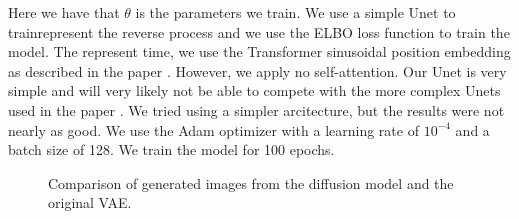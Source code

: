 Here we have that $\theta$ is the parameters we train. We use a simple Unet to trainrepresent the reverse process and we use the ELBO loss function to train the model. The represent time, we use the  Transformer sinusoidal position embedding as described in the paper \cite{diffusion}. However, we apply no self-attention. Our Unet is very simple and will very likely not be able to compete with the more complex Unets used in the paper \cite{diffusion}. We tried using a simpler arcitecture, but the results were not nearly as good. We use the Adam optimizer with a learning rate of $10^{-4}$ and a batch size of 128. We train the model for 100 epochs.

\begin{figure}[H]
    \centering
    \caption{Comparison of generated images from the diffusion model and the original VAE.}
    \label{fig:example}%
\end{figure}

